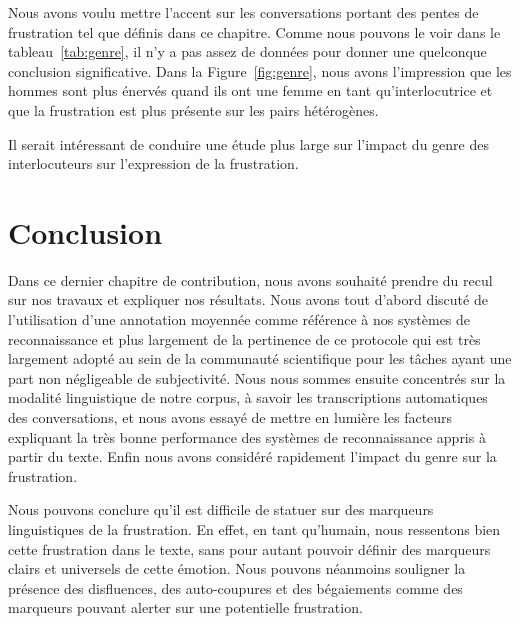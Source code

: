 

Nous avons voulu mettre l'accent sur les conversations portant des pentes de frustration tel que définis dans ce chapitre. Comme nous pouvons le voir dans le tableau~\ref{tab:genre}, il n'y a pas assez de données pour donner une quelconque conclusion significative. Dans la Figure~\ref{fig:genre}, nous avons l'impression que les hommes sont plus énervés quand ils ont une femme en tant qu'interlocutrice et que la frustration est plus présente sur les pairs hétérogènes.



 Il serait intéressant de conduire une étude plus large sur l'impact du genre des interlocuteurs sur l'expression de la frustration.

\section{Conclusion}
Dans ce dernier chapitre de contribution, nous avons souhaité prendre du recul sur nos travaux et expliquer nos résultats. Nous avons tout d'abord discuté de l'utilisation d'une annotation moyennée comme référence à nos systèmes de reconnaissance et plus largement de la pertinence de ce protocole qui est très largement adopté au sein de la communauté scientifique pour les tâches ayant une part non négligeable de subjectivité. Nous nous sommes ensuite concentrés sur la modalité linguistique de notre corpus, à savoir les transcriptions automatiques des conversations, et nous avons essayé de mettre en lumière les facteurs expliquant la très bonne performance des systèmes de reconnaissance appris à partir du texte. Enfin nous avons considéré rapidement l'impact du genre sur la frustration.

Nous pouvons conclure qu'il est difficile de statuer sur des marqueurs linguistiques de la frustration. En effet, en tant qu'humain, nous ressentons bien cette frustration dans le texte, sans pour autant pouvoir définir des marqueurs clairs et universels de cette émotion. Nous pouvons néanmoins souligner la présence des disfluences, des auto-coupures et des bégaiements comme des marqueurs pouvant alerter sur une potentielle frustration.
